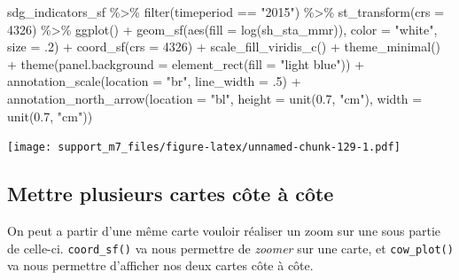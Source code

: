 \documentclass[
]{book}
\newenvironment{Shaded}{\begin{snugshade}}{\end{snugshade}}
\newcommand{\AttributeTok}[1]{\textcolor[rgb]{0.77,0.63,0.00}{#1}}
\newcommand{\DecValTok}[1]{\textcolor[rgb]{0.00,0.00,0.81}{#1}}
\newcommand{\FloatTok}[1]{\textcolor[rgb]{0.00,0.00,0.81}{#1}}
\newcommand{\FunctionTok}[1]{\textcolor[rgb]{0.00,0.00,0.00}{#1}}
\newcommand{\NormalTok}[1]{#1}
\newcommand{\SpecialCharTok}[1]{\textcolor[rgb]{0.00,0.00,0.00}{#1}}
\newcommand{\StringTok}[1]{\textcolor[rgb]{0.31,0.60,0.02}{#1}}
\begin{document}
\begin{Shaded}
\begin{Highlighting}[]
\NormalTok{sdg\_indicators\_sf }\SpecialCharTok{\%\textgreater{}\%}
  \FunctionTok{filter}\NormalTok{(timeperiod }\SpecialCharTok{==} \StringTok{"2015"}\NormalTok{) }\SpecialCharTok{\%\textgreater{}\%}
  \FunctionTok{st\_transform}\NormalTok{(}\AttributeTok{crs =} \DecValTok{4326}\NormalTok{) }\SpecialCharTok{\%\textgreater{}\%}
  \FunctionTok{ggplot}\NormalTok{() }\SpecialCharTok{+}
  \FunctionTok{geom\_sf}\NormalTok{(}\FunctionTok{aes}\NormalTok{(}\AttributeTok{fill =} \FunctionTok{log}\NormalTok{(sh\_sta\_mmr)), }\AttributeTok{color =} \StringTok{"white"}\NormalTok{, }\AttributeTok{size =}\NormalTok{ .}\DecValTok{2}\NormalTok{) }\SpecialCharTok{+}
  \FunctionTok{coord\_sf}\NormalTok{(}\AttributeTok{crs =} \DecValTok{4326}\NormalTok{) }\SpecialCharTok{+}
  \FunctionTok{scale\_fill\_viridis\_c}\NormalTok{() }\SpecialCharTok{+}
  \FunctionTok{theme\_minimal}\NormalTok{() }\SpecialCharTok{+}
  \FunctionTok{theme}\NormalTok{(}\AttributeTok{panel.background =} \FunctionTok{element\_rect}\NormalTok{(}\AttributeTok{fill =} \StringTok{"light blue"}\NormalTok{)) }\SpecialCharTok{+}
  \FunctionTok{annotation\_scale}\NormalTok{(}\AttributeTok{location =} \StringTok{"br"}\NormalTok{, }\AttributeTok{line\_width =}\NormalTok{ .}\DecValTok{5}\NormalTok{) }\SpecialCharTok{+}
  \FunctionTok{annotation\_north\_arrow}\NormalTok{(}\AttributeTok{location =} \StringTok{"bl"}\NormalTok{, }\AttributeTok{height =} \FunctionTok{unit}\NormalTok{(}\FloatTok{0.7}\NormalTok{, }\StringTok{"cm"}\NormalTok{), }\AttributeTok{width =} \FunctionTok{unit}\NormalTok{(}\FloatTok{0.7}\NormalTok{, }\StringTok{"cm"}\NormalTok{))}
\end{Highlighting}
\end{Shaded}

\texttt{[image: support\_m7\_files/figure-latex/unnamed-chunk-129-1.pdf]}

\hypertarget{mettre-plusieurs-cartes-cuxf4te-uxe0-cuxf4te}{%
\subsection{Mettre plusieurs cartes côte à côte}\label{mettre-plusieurs-cartes-cuxf4te-uxe0-cuxf4te}}

On peut a partir d'une même carte vouloir réaliser un zoom sur une sous partie de celle-ci.
\texttt{coord\_sf()} va nous permettre de \emph{zoomer} sur une carte, et \texttt{cow\_plot()} va nous permettre d'afficher nos deux cartes côte à côte.
\end{document}
